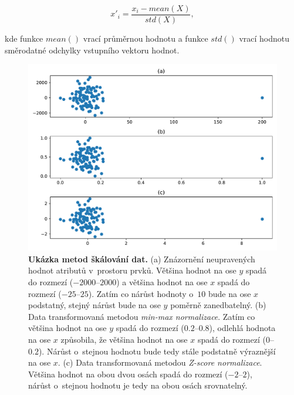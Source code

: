 \begin{equation}
	x'_i = \frac{x_i - mean(X)}{std(X)},
\end{equation}

\medskip

\noindent kde funkce $mean()$ vrací průměrnou hodnotu a funkce $std()$ vrací hodnotu směrodatné odchylky vstupního vektoru hodnot.\cite{data_mining}\cite{data_preprocessing}

\begin{figure}[h]
    \includegraphics[width=\textwidth]{obrazky/skalovani.pdf}
    \caption{\textbf{Ukázka metod škálování dat.} (a) Znázornění neupravených hodnot atributů v~prostoru prvků. Většina hodnot na ose $y$ spadá do rozmezí ($-2000$--$2000$) a většina hodnot na ose $x$ spadá do rozmezí ($-25$--$25$). Zatím co nárůst hodnoty o~$10$ bude na ose $x$ podstatný, stejný nárůst bude na ose $y$ poměrně zanedbatelný. (b) Data transformovaná metodou \textit{min-max normalizace}. Zatím co většina hodnot na ose $y$ spadá do rozmezí ($0.2$--$0.8$), odlehlá hodnota na ose $x$ způsobila, že většina hodnot na ose $x$ spadá do rozmezí ($0$--$0.2$). Nárůst o~stejnou hodnotu bude tedy stále podstatně výraznější na ose $x$. (c) Data transformovaná metodou \textit{Z-score normalizace}. Většina hodnot na obou dvou osách spadá do rozmezí ($-2$--$2$), nárůst o~stejnou hodnotu je tedy na obou osách srovnatelný.}
    \label{obr_sklaovani_dat}
\end{figure}

